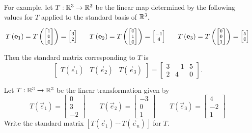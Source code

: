 \begin{applicationActivities}
\begin{definition}
\vspace{1em}

For example,
let \(T: \IR^3 \rightarrow \IR^2\) be the linear map determined by
the following values for \(T\) applied to the standard basis of \(\IR^3\).

\[\scriptsize
  T\left(\vec e_1 \right)
=
  T\left(\begin{bmatrix} 1 \\ 0 \\ 0 \end{bmatrix} \right)
=
  \begin{bmatrix} 3 \\ 2\end{bmatrix}
\hspace{2em}
  T\left(\vec e_2 \right)
=
  T\left(\begin{bmatrix} 0 \\ 1 \\ 0 \end{bmatrix} \right)
=
  \begin{bmatrix} -1 \\ 4\end{bmatrix}
\hspace{2em}
  T\left(\vec e_3 \right)
=
  T\left(\begin{bmatrix} 0 \\ 0 \\ 1 \end{bmatrix} \right)
=
  \begin{bmatrix} 5 \\ 0\end{bmatrix}
\]

Then the standard matrix corresponding to \(T\) is
\[
  \begin{bmatrix}T(\vec e_1) & T(\vec e_2) & T(\vec e_3)\end{bmatrix}
=
  \begin{bmatrix}3 & -1 & 5 \\ 2 & 4 & 0 \end{bmatrix}
.\]
\end{definition}

\begin{activity}{3}
  Let $T: \IR^3 \rightarrow \IR^3$ be the linear transformation given by
  \[
    T\left(\vec e_1 \right)
  =
    \begin{bmatrix} 0 \\ 3 \\ -2\end{bmatrix}
  \hspace{2em}
    T\left(\vec e_2 \right)
  =
    \begin{bmatrix} -3 \\ 0 \\ 1\end{bmatrix}
  \hspace{2em}
    T\left(\vec e_3 \right)
  =
    \begin{bmatrix} 4 \\ -2 \\ 1\end{bmatrix}
  \]
Write the standard matrix \([T(\vec e_1) \,\cdots\, T(\vec e_n)]\) for \(T\).
\end{activity}


\end{applicationActivities}
